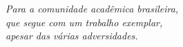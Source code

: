 \documentclass[
	12pt,				%
	openright,			%
	oneside,			%
	a4paper,			%
	chapter=TITLE,		%
	english,			%
	french,				%
	spanish,			%
	brazil				%
	]{abntex2}
\theoremstyle{definition}
\renewcommand{\pretextual}{
  \pagenumbering{roman} %
  \aliaspagestyle{chapter}{estilo_pretextual}%
  \pagestyle{estilo_pretextual}
  \aliaspagestyle{cleared}{empty}
  \aliaspagestyle{part}{estilo_pretextual}
}
\begin{document}
\frenchspacing 


\imprimircapa

\imprimirfolhaderosto
%     
\newpage
\begin{fichacatalografica}
	
\end{fichacatalografica}

% 
\begin{folhadeaprovacao}
    
\end{folhadeaprovacao}

\begin{dedicatoria}
   \vspace*{\fill}
   \noindent
   \begin{flushright}
      \textit{Para a comunidade acadêmica brasileira,}\\
      \textit{que segue com um trabalho exemplar,}\\
      \textit{apesar das várias adversidades.}
   \end{flushright}
\end{dedicatoria}
\end{document}
